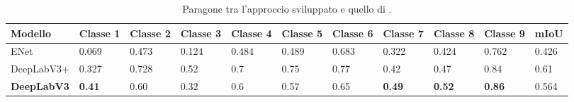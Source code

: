 


\begin{table}[h!]
\hspace{-0.7in}
\begin{tabular}{||p{2.3cm} | p{1cm} p{1cm} p{1cm} p{1cm} p{1cm} p{1cm} p{1cm} p{1cm} p{1cm} | p{1cm}||}
 \hline
    Modello & Classe 1 & Classe 2 & Classe 3 & Classe 4 & Classe 5 & Classe 6 & Classe 7 & Classe 8 & Classe 9 & mIoU \\ [0.5ex]
 \hline\hline
 \hline
ENet & 0.069 & 0.473 & 0.124 & 0.484 &  0.489 & 0.683 & 0.322 & 0.424 & 0.762 & 0.426 \\ [1ex] 
 \hline
DeepLabV3+ & 0.327 & 0.728 & 0.52 & 0.7 &  0.75 & 0.77 & 0.42 & 0.47 & 0.84 & 0.61 \\ [1ex]
\hline
\textbf{DeepLabV3} & \textbf{0.41 }& 0.60 & 0.32 & 0.6 &  0.57 & 0.65 & \textbf{0.49} & \textbf{0.52} & \textbf{0.86} & 0.564 \\ [1ex]
 \hline
\end{tabular}
\caption{Paragone tra l'approccio sviluppato e quello di \cite{floodnet}.}
\label{table:paragone}
\end{table}






